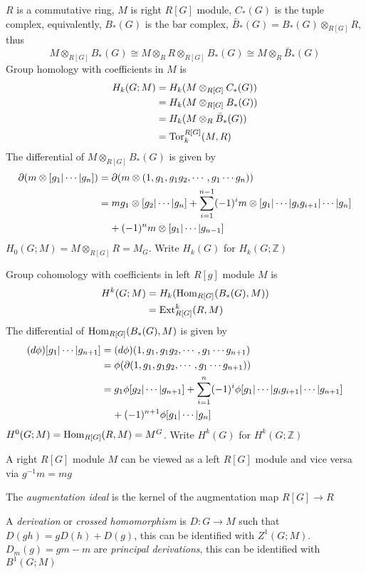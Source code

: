 \documentclass[main]{subfiles}
\begin{document}
\begin{definition}
$R$ is a commutative ring, $M$ is right $R[G]$ module, $C_*(G)$ is the tuple complex, equivalently, $B_*(G)$ is the bar complex, $\bar B_*(G)=B_*(G)\otimes_{R[G]}R$, thus
\[M\otimes_{R[G]}B_*(G)\cong M\otimes_{R}R\otimes_{R[G]}B_*(G)\cong M\otimes_R\bar B_*(G)\]
Group homology with coefficients in $M$ is
\begin{align*}
H_k(G;M)&=H_k(M\otimes_{R[G]}C_*(G)) \\
&=H_k(M\otimes_{R[G]}B_*(G)) \\
&=H_k(M\otimes_{R}\bar B_*(G)) \\
&=\operatorname{Tor}_k^{R[G]}(M,R)
\end{align*}
The differential of $M\otimes_{R[G]} B_*(G)$ is given by
\begin{align*}
\partial(m\otimes[g_1|\cdots|g_n])&=\partial(m\otimes(1,g_1,g_1g_2,\cdots,g_1\cdots g_n)) \\
&=mg_1\otimes[g_2|\cdots|g_n]+\sum_{i=1}^{n-1}(-1)^im\otimes[g_1|\cdots|g_ig_{i+1}|\cdots|g_n] \\
&\mkern20mu+(-1)^nm\otimes[g_1|\cdots|g_{n-1}]
\end{align*}
$H_0(G;M)=M\otimes_{R[G]}R=M_G$. Write $H_k(G)$ for $H_k(G;\mathbb Z)$ \par
Group cohomology with coefficients in left $R[g]$ module $M$ is
\begin{align*}
H^k(G;M)&=H_k(\operatorname{Hom}_{R[G]}(B_*(G),M)) \\
&=\operatorname{Ext}^k_{R[G]}(R,M)
\end{align*}
The differential of $\operatorname{Hom}_{R[G]}(B_*(G),M)$ is given by
\begin{align*}
(d\phi)[g_1|\cdots|g_{n+1}]&=(d\phi)(1,g_1,g_1g_2,\cdots,g_1\cdots g_{n+1}) \\
&=\phi(\partial(1,g_1,g_1g_2,\cdots,g_1\cdots g_{n+1})) \\
&=g_1\phi[g_2|\cdots|g_{n+1}]+\sum_{i=1}^{n}(-1)^i\phi[g_1|\cdots|g_ig_{i+1}|\cdots|g_{n+1}] \\
&\mkern20mu+(-1)^{n+1}\phi[g_1|\cdots|g_n]
\end{align*}
$H^0(G;M)=\operatorname{Hom}_{R[G]}(R,M)=M^G$. Write $H^k(G)$ for $H^k(G;\mathbb Z)$ \par
\end{definition}

\begin{remark}
A right $R[G]$ module $M$ can be viewed as a left $R[G]$ module and vice versa via $g^{-1}m=mg$
\end{remark}

\begin{definition}
The \textit{augmentation ideal} is the kernel of the augmentation map $R[G]\to R$
\end{definition}

\begin{definition}
A \textit{derivation} or \textit{crossed homomorphism} is $D:G\to M$ such that $D(gh)=gD(h)+D(g)$, this can be identified with $Z^1(G;M)$. $D_m(g)=gm-m$ are \textit{principal derivations}, this can be identified with $B^1(G;M)$
\end{definition}
\end{document}

